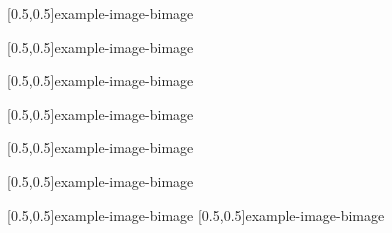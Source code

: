 



\graphicspath{{Figures/}{Figures/Iceland}}


\subtitle{Day 1}
\date{07.10.2019}


    
    
    [0.5,0.5]{example-image-b}{image}
    
    [0.5,0.5]{example-image-b}{image}
    
    [0.5,0.5]{example-image-b}{image}
    
    [0.5,0.5]{example-image-b}{image}
    
    
    [0.5,0.5]{example-image-b}{image}
    
    [0.5,0.5]{example-image-b}{image}
    
    [0.5,0.5]{example-image-b}{image}
%     
    [0.5,0.5]{example-image-b}{image}

